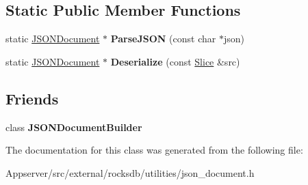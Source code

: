 \subsection*{Static Public Member Functions}
\begin{DoxyCompactItemize}
\item 
static \hyperlink{classrocksdb_1_1JSONDocument}{J\+S\+O\+N\+Document} $\ast$ {\bfseries Parse\+J\+S\+ON} (const char $\ast$json)\hypertarget{classrocksdb_1_1JSONDocument_a25424fd51385c0c795bd9d95d53b85bc}{}\label{classrocksdb_1_1JSONDocument_a25424fd51385c0c795bd9d95d53b85bc}

\item 
static \hyperlink{classrocksdb_1_1JSONDocument}{J\+S\+O\+N\+Document} $\ast$ {\bfseries Deserialize} (const \hyperlink{classrocksdb_1_1Slice}{Slice} \&src)\hypertarget{classrocksdb_1_1JSONDocument_af16c6f77dc3c402fd5fd4fc4be1c6264}{}\label{classrocksdb_1_1JSONDocument_af16c6f77dc3c402fd5fd4fc4be1c6264}

\end{DoxyCompactItemize}
\subsection*{Friends}
\begin{DoxyCompactItemize}
\item 
class {\bfseries J\+S\+O\+N\+Document\+Builder}\hypertarget{classrocksdb_1_1JSONDocument_aca5ff666ab7c2a88cd39d1827e970a36}{}\label{classrocksdb_1_1JSONDocument_aca5ff666ab7c2a88cd39d1827e970a36}

\end{DoxyCompactItemize}


The documentation for this class was generated from the following file\+:\begin{DoxyCompactItemize}
\item 
Appserver/src/external/rocksdb/utilities/json\+\_\+document.\+h\end{DoxyCompactItemize}
